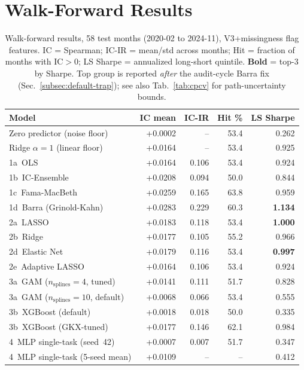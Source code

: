 \documentclass[11pt]{article}
\begin{document}
\section{Walk-Forward Results}\label{sec:results-wf}

\begin{table}[t]
\centering
\caption{Walk-forward results, 58 test months (2020-02 to 2024-11),
V3+missingness flag features. IC = Spearman; IC-IR = mean/std across
months; Hit = fraction of months with IC$>$0;
LS Sharpe = annualized long-short quintile.
\textbf{Bold} = top-3 by Sharpe. Top group is reported \emph{after} the
audit-cycle Barra fix (Sec.~\ref{subsec:default-trap}); see also
Tab.~\ref{tab:cpcv} for path-uncertainty bounds.}
\label{tab:wf-results}
\small
\begin{tabular}{l r r r r}
\toprule
Model & IC mean & IC-IR & Hit \% & LS Sharpe \\
\midrule
Zero predictor (noise floor)       & +0.0002 & --      & 53.4 & 0.262 \\
Ridge $\alpha{=}1$ (linear floor)  & +0.0164 & --      & 53.4 & 0.925 \\
\midrule
1a~OLS                            & +0.0164 & 0.106 & 53.4 & 0.924 \\
1b~IC-Ensemble                    & +0.0208 & 0.094 & 50.0 & 0.844 \\
1c~Fama-MacBeth                   & +0.0259 & 0.165 & 63.8 & 0.959 \\
1d~Barra (Grinold-Kahn)           & +0.0283 & 0.229 & 60.3 & \textbf{1.134} \\
\midrule
2a~LASSO                          & +0.0183 & 0.118 & 53.4 & \textbf{1.000} \\
2b~Ridge                          & +0.0177 & 0.105 & 55.2 & 0.966 \\
2d~Elastic Net                    & +0.0179 & 0.116 & 53.4 & \textbf{0.997} \\
2e~Adaptive LASSO                 & +0.0164 & 0.106 & 53.4 & 0.924 \\
\midrule
3a~GAM ($n_{\text{splines}}{=}4$, tuned)  & +0.0141 & 0.111 & 51.7 & 0.828 \\
3a~GAM ($n_{\text{splines}}{=}10$, default) & +0.0068 & 0.066 & 53.4 & 0.555 \\
3b~XGBoost (default)              & +0.0018 & 0.018 & 50.0 & 0.335 \\
3b~XGBoost (GKX-tuned)            & +0.0177 & 0.146 & 62.1 & 0.984 \\
\midrule
4~MLP single-task (seed~42)       & +0.0007 & 0.007 & 51.7 & 0.347 \\
4~MLP single-task (5-seed mean)   & +0.0109 & --   & --   & 0.412 \\
\bottomrule
\end{tabular}
\end{table}
\end{document}
